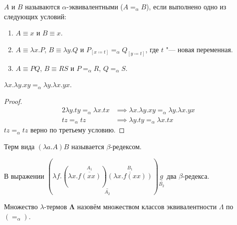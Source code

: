 \begin{definition}
    $A$ и $B$ называются $\alpha$-эквивалентными ($A=_{\alpha}B$), если выполнено одно из следующих условий:
    \begin{enumerate}
        \item $A\equiv{}x$ и $B\equiv{}x$.
        \item $A\equiv{}\lambda{}x.P$, $B\equiv{}\lambda{}y.Q$ и $P_{[x\coloneqq{}t]}=_{\alpha}Q_{[y\coloneqq{}t]}$, где $t$ "--- новая переменная.
        \item $A\equiv{}PQ$, $B\equiv{}RS$ и $P=_{\alpha}R$, $Q=_{\alpha}S$.
    \end{enumerate}
\end{definition}

\begin{example}
    $\lambda{}x.\lambda{}y.xy=_{\alpha}\lambda{}y.\lambda{}x.yx$.
    \begin{proof}
        \begin{alignat*}{2}
            \lambda{}y.ty=_{\alpha}\lambda{}x.tx &\implies \lambda{}x.\lambda{}y.xy=_{\alpha}\lambda{}y.\lambda{}x.yx \\
            tz=_{\alpha}tz &\implies \lambda{}y.ty=_{\alpha}\lambda{}x.tx
        \end{alignat*}
        $tz=_{\alpha}tz$ верно по третьему условию.
    \end{proof}
\end{example}

\begin{definition}
    Терм вида $\left(\lambda{}a.A\right)B$ называется $\beta$-редексом.
\end{definition}

\begin{example}
    В выражении
    $
        (
            \lambda{}f.
                \underset{A_2}{\underline{
                    (\lambda{}x.\overset{A_1}{\overline{f(xx)}})
                    \overset{B_1}{\overline{(\lambda{}x.f(xx))}}
                }}
        )\underset{B_2}{\underline{g}}
    $ два $\beta$-редекса.
\end{example}

\begin{definition}
    Множество $\lambda$-термов $\boldsymbol{\Lambda}$ назовём множеством классов эквивалентности $\Lambda$ по $(=_{\alpha})$.
\end{definition}

